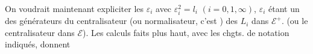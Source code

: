 On voudrait maintenant expliciter les $\varepsilon_i$ avec $\varepsilon_i^2=l_i$ $(i=0,1,\infty)$, $\varepsilon_i$ étant un des générateurs du centralisateur (ou normalisateur, c'est ) des $L_i$ dans $\mathcal E^+$. (ou le centralisateur dans $\mathcal E$). Les calculs faits plus haut, avec les chgts. de notation indiqués, donnent
\deleted{\[
(8)\quad\left\{\begin{aligned}
\varepsilon_0&=l_0^{\unsure{-1}}\sigma_1\unsure{l_1^{-1}|l_0^{-1}}\\
\varepsilon_1&=l_\infty^{-1}\sigma_\infty l_1^{-1}\\
\varepsilon_\infty&=l_0^{-1}\sigma_0 l_\infty^{\unsure{-1}}
\end{aligned}\right.
\]}
